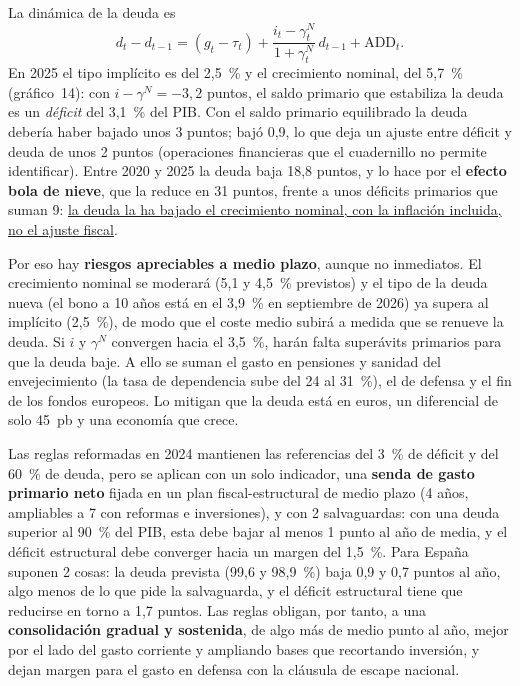 \begin{examen}
La dinámica de la deuda es
\[
d_t-d_{t-1}=(g_t-\tau_t)+\frac{i_t-\gamma^N_t}{1+\gamma^N_t}\,d_{t-1}+\mathrm{ADD}_t .
\]
En 2025 el tipo implícito es del 2,5~\% y el crecimiento nominal, del 5,7~\% (gráfico~14): con $i-\gamma^N=-3{,}2$ puntos, el saldo primario que estabiliza la deuda es un \emph{déficit} del 3,1~\% del PIB. Con el saldo primario equilibrado la deuda debería haber bajado unos 3 puntos; bajó 0,9, lo que deja un ajuste entre déficit y deuda de unos 2 puntos (operaciones financieras que el cuadernillo no permite identificar). Entre 2020 y 2025 la deuda baja 18,8 puntos, y lo hace por el \textbf{efecto bola de nieve}, que la reduce en 31 puntos, frente a unos déficits primarios que suman 9: \uline{la deuda la ha bajado el crecimiento nominal, con la inflación incluida, no el ajuste fiscal}.

Por eso hay \textbf{riesgos apreciables a medio plazo}, aunque no inmediatos. El crecimiento nominal se moderará (5,1 y 4,5~\% previstos) y el tipo de la deuda nueva (el bono a 10 años está en el 3,9~\% en septiembre de 2026) ya supera al implícito (2,5~\%), de modo que el coste medio subirá a medida que se renueve la deuda. Si $i$ y $\gamma^N$ convergen hacia el 3,5~\%, harán falta superávits primarios para que la deuda baje. A ello se suman el gasto en pensiones y sanidad del envejecimiento (la tasa de dependencia sube del 24 al 31~\%), el de defensa y el fin de los fondos europeos. Lo mitigan que la deuda está en euros, un diferencial de solo 45~pb y una economía que crece.

Las reglas reformadas en 2024 mantienen las referencias del 3~\% de déficit y del 60~\% de deuda, pero se aplican con un solo indicador, una \textbf{senda de gasto primario neto} fijada en un plan fiscal-estructural de medio plazo (4 años, ampliables a 7 con reformas e inversiones), y con 2 salvaguardas: con una deuda superior al 90~\% del PIB, esta debe bajar al menos 1 punto al año de media, y el déficit estructural debe converger hacia un margen del 1,5~\%. Para España suponen 2 cosas: la deuda prevista (99,6 y 98,9~\%) baja 0,9 y 0,7 puntos al año, algo menos de lo que pide la salvaguarda, y el déficit estructural tiene que reducirse en torno a 1,7 puntos. Las reglas obligan, por tanto, a una \textbf{consolidación gradual y sostenida}, de algo más de medio punto al año, mejor por el lado del gasto corriente y ampliando bases que recortando inversión, y dejan margen para el gasto en defensa con la cláusula de escape nacional.
\end{examen}

